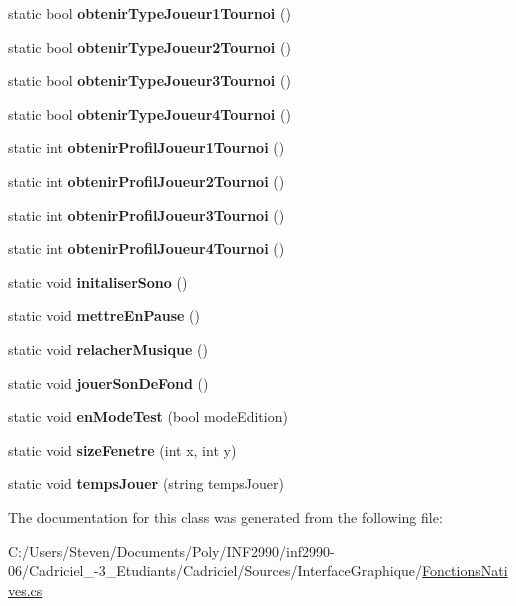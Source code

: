 \begin{DoxyCompactItemize}
\item 
static bool {\bfseries obtenir\+Type\+Joueur1\+Tournoi} ()
\item 
static bool {\bfseries obtenir\+Type\+Joueur2\+Tournoi} ()
\item 
static bool {\bfseries obtenir\+Type\+Joueur3\+Tournoi} ()
\item 
static bool {\bfseries obtenir\+Type\+Joueur4\+Tournoi} ()
\item 
static int {\bfseries obtenir\+Profil\+Joueur1\+Tournoi} ()
\item 
static int {\bfseries obtenir\+Profil\+Joueur2\+Tournoi} ()
\item 
static int {\bfseries obtenir\+Profil\+Joueur3\+Tournoi} ()
\item 
static int {\bfseries obtenir\+Profil\+Joueur4\+Tournoi} ()
\item 
static void {\bfseries initaliser\+Sono} ()
\item 
static void {\bfseries mettre\+En\+Pause} ()
\item 
static void {\bfseries relacher\+Musique} ()
\item 
static void {\bfseries jouer\+Son\+De\+Fond} ()
\item 
static void {\bfseries en\+Mode\+Test} (bool mode\+Edition)
\item 
static void {\bfseries size\+Fenetre} (int x, int y)
\item 
static void {\bfseries temps\+Jouer} (string temps\+Jouer)
\end{DoxyCompactItemize}


The documentation for this class was generated from the following file\+:\begin{DoxyCompactItemize}
\item 
C\+:/\+Users/\+Steven/\+Documents/\+Poly/\+I\+N\+F2990/inf2990-\/06/\+Cadriciel\+\_-\/3\+\_\+\+Etudiants/\+Cadriciel/\+Sources/\+Interface\+Graphique/\hyperlink{_fonctions_natives_8cs}{Fonctions\+Natives.\+cs}\end{DoxyCompactItemize}
